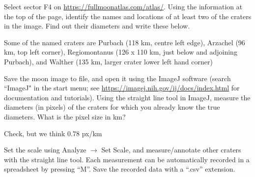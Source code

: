 \documentclass[addpoints]{exam}
\begin{document}
\begin{questions}
  \question[10] Select sector F4 on
  {\color{blue} \url{https://fullmoonatlas.com/atlas/}}. Using the information at the top of the
  page, identify the names and locations of at least two of the craters in the image. Find out their diameters and write these below.
   \begin{solutionorlines}[1in]
 	Some of the named craters are Purbach (118 km, centre left edge), Arzachel (96 km, top left corner), Regiomontanus (126 x 110 km, just below and adjoining Purbach), and Walther (135 km, larger crater lower left hand corner)
 \end{solutionorlines}
 
 
  \question[10] Save the moon image to file, and open
  it using the ImageJ software (search ``ImageJ" in the start
  menu; see {\color{blue} \url{https://imagej.nih.gov/ij/docs/index.html}} for
  documentation and tutorials). Using the straight line tool in ImageJ, measure the diameters (in pixels) of the craters for which you already know the true diameters. What is the pixel size in km? 
  \begin{solutionorlines}[1in]
    Check, but we think 0.78 px/km
  \end{solutionorlines}

  Set the scale using Analyze $\rightarrow$ Set Scale, and
  measure/annotate other craters with the straight line tool. Each
  measurement can be automatically recorded in a spreadsheet by
  pressing ``M''. Save the recorded data with a ``.csv'' extension.


\end{questions}
\end{document}

